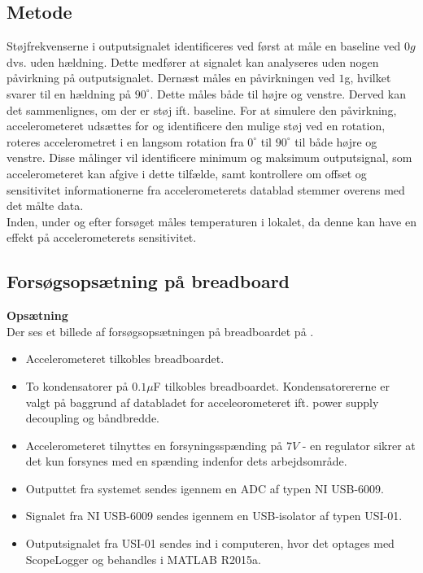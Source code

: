 \subsection{Metode}
Støjfrekvenserne i outputsignalet identificeres ved først at måle en baseline ved $0g$ dvs. uden hældning. Dette medfører at signalet kan analyseres uden nogen påvirkning på outputsignalet. Dernæst måles en påvirkningen ved $1$g, hvilket svarer til en hældning på $90^{\circ}$. Dette måles både til højre og venstre. Derved kan det sammenlignes, om der er støj ift. baseline. %
For at simulere den påvirkning, accelerometeret udsættes for og identificere den mulige støj ved en rotation, roteres accelerometret i en langsom rotation fra $0^{\circ}$ til $90^{\circ}$ til både højre og venstre. Disse målinger vil identificere minimum og maksimum outputsignal, som accelerometeret kan afgive i dette tilfælde, samt kontrollere om offset og sensitivitet informationerne fra accelerometerets datablad stemmer overens med det målte data. \\
Inden, under og efter forsøget måles temperaturen i lokalet, da denne kan have en effekt på accelerometerets sensitivitet. \cite{Devices2009}

\subsection{Forsøgsopsætning på breadboard}
\textbf{Opsætning}\\
Der ses et billede af forsøgsopsætningen på breadboardet på .
\begin{itemize}
\item Accelerometeret tilkobles breadboardet.
\item To kondensatorer på $0.1\mu$F tilkobles breadboardet. Kondensatorererne er valgt på baggrund af databladet for acceleorometeret ift. power supply decoupling og båndbredde.
\item Accelerometeret tilnyttes en forsyningsspænding på $7V$ - en regulator sikrer at det kun forsynes med en spænding indenfor dets arbejdsområde.
\item Outputtet fra systemet sendes igennem en ADC af typen NI USB-6009.
\item Signalet fra NI USB-6009 sendes igennem en USB-isolator af typen USI-01.
\item Outputsignalet fra USI-01 sendes ind i computeren, hvor det optages med ScopeLogger og behandles i MATLAB R2015a.
\end{itemize}

